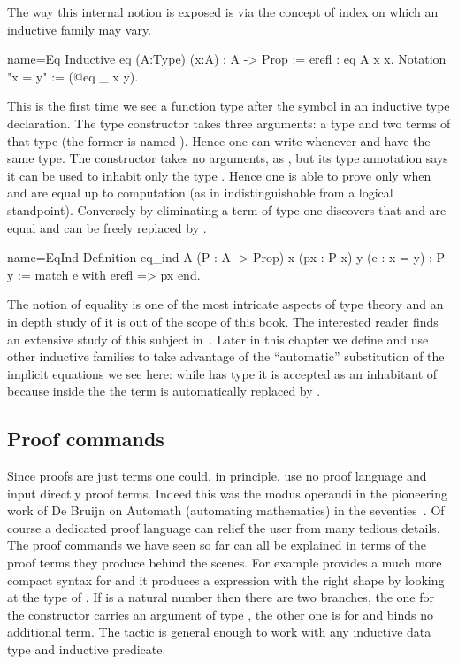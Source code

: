 The way this internal notion is exposed is via the concept of index
on which an inductive family may vary.

\begin{coq}{name=Eq}{}
Inductive eq (A:Type) (x:A) : A -> Prop := erefl : eq A x x.
Notation "x = y" := (@eq _ x y).
\end{coq}

This is the first time we see a function type after the \C{:} symbol
in an inductive type declaration.
The  type constructor takes three arguments: a type  and
two terms of that type (the former is named ).
Hence one can write  whenever  and 
have the same type.
The  constructor takes no arguments, as , but its type
annotation says it can be used to inhabit only the type .
Hence one is able to prove  only when  and  are
equal up to computation (as in indistinguishable from a logical standpoint).
Conversely by eliminating a term
of type  one discovers that   and  are
equal and  can be freely replaced by .

\begin{coq}{name=EqInd}{}
Definition eq_ind A (P : A -> Prop) x (px : P x) y (e : x = y) : P y :=
  match e with erefl => px end.
\end{coq}

The notion of equality is one of the most intricate aspects of type
theory and an in depth study of it is out of the scope of this book.  The interested reader
finds an extensive study of this subject in~\cite{hottbook}.  Later in this
chapter we define and use other inductive families to take advantage
of the ``automatic'' substitution of the implicit equations we see here:
while  has type  it is accepted as an
inhabitant of  because inside the  the term 
is automatically replaced by .

\subsection{Proof commands}

Since proofs are just terms one could,
in principle, use no proof language and input directly proof terms.
Indeed this was the modus operandi in the pioneering work of
De Bruijn on Automath (automating mathematics) in the seventies~\cite{nederpelt-94}.
Of course a dedicated proof language can relief the user from
many tedious details.  The proof commands we have seen so far can all be
explained in terms of the proof terms they produce behind the scenes.
For example  provides a much more compact syntax
for  and it produces a
 expression with the right
shape by looking at the type of .  If  is a natural number then there
are two branches, the one for the  constructor carries an argument of type
, the other one is for  and binds no additional term.
The  tactic is general enough to work with any inductive data type
and inductive predicate.

